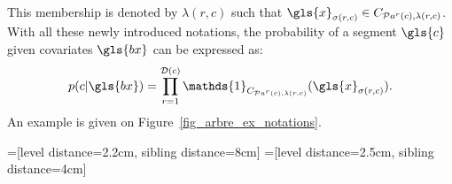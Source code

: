 This membership is denoted by $\lambda(r,c)$ such that $\gls{x}_{\sigma(r,c)} \in C_{\mathcal{P}a^r(c),\lambda(r,c)}$.
With all these newly introduced notations, the probability of a segment $\gls{c}$ given covariates $\gls{bx}$ can be expressed as:
\begin{equation} \label{eq:tree}
p( c | \gls{bx}) = \prod_{r = 1}^{\mathcal{D}(c)} \mathds{1}_{C_{\mathcal{P}a^r(c),\lambda(r,c)}} (\gls{x}_{\sigma(r,c)}).
\end{equation}
An example is given on Figure~\ref{fig_arbre_ex_notations}.

=[level distance=2.2cm, sibling distance=8cm]
=[level distance=2.5cm, sibling distance=4cm]


